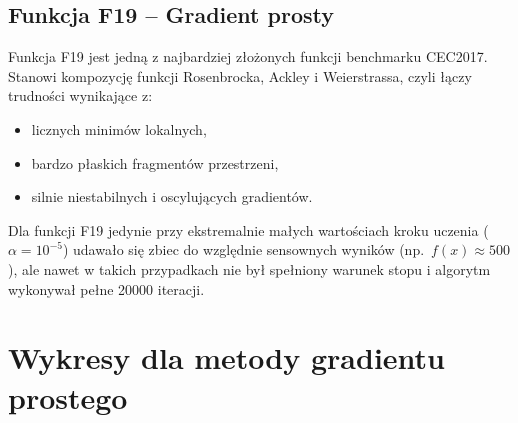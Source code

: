 \documentclass[a4paper]{article}
\begin{document}
\subsection{Funkcja F19 – Gradient prosty}

Funkcja F19 jest jedną z najbardziej złożonych funkcji benchmarku CEC2017.  
Stanowi kompozycję funkcji Rosenbrocka, Ackley i Weierstrassa, czyli łączy trudności wynikające z:
\begin{itemize}
  \item licznych minimów lokalnych,
  \item bardzo płaskich fragmentów przestrzeni,
  \item silnie niestabilnych i oscylujących gradientów.
\end{itemize}

Dla funkcji F19 jedynie przy ekstremalnie małych wartościach kroku uczenia (\(\alpha = 10^{-5}\)) udawało się zbiec do względnie sensownych wyników (np.~\(f(x) \approx 500\)), ale nawet w takich przypadkach nie był spełniony warunek stopu i algorytm wykonywał pełne 20000 iteracji.

\section{Wykresy dla metody gradientu prostego}
\end{document}
